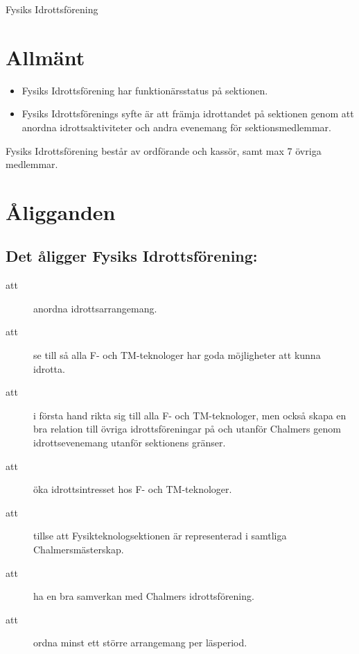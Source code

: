 \documentclass[a4paper]{article}
\begin{document}
\renewcommand{\forening}{Fysiks Idrottsförening} %

\begin{foreningenv}{\forening{}} %
    \section{Allmänt}
    \begin{itemize}
        \item Fysiks Idrottsförening har funktionärsstatus på sektionen.
        \item Fysiks Idrottsförenings syfte är att främja idrottandet på sektionen genom att anordna idrottsaktiviteter och andra evenemang för sektionsmedlemmar.
    \end{itemize}
    
    Fysiks Idrottsförening består av ordförande och kassör, samt max 7 övriga medlemmar.
    
    \section{Åligganden}
    \aliggsektfunkt{}
    
    \subsection{Det åligger Fysiks Idrottsförening:}
    \begin{description}
        \item[att] anordna idrottsarrangemang.
        \item[att] se till så alla F- och TM-teknologer har goda möjligheter att kunna idrotta.
        \item[att] i första hand rikta sig till alla F- och TM-teknologer, men också skapa en bra relation till övriga idrottsföreningar på och utanför Chalmers genom idrottsevenemang utanför sektionens gränser.
        \item[att] öka idrottsintresset hos F- och TM-teknologer.
        \item[att] tillse att Fysikteknologsektionen är representerad i samtliga Chalmersmästerskap.
        \item[att] ha en bra samverkan med Chalmers idrottsförening.
        \item[att] ordna minst ett större arrangemang per läsperiod.
    \end{description}
    

\end{foreningenv}
\end{document}
